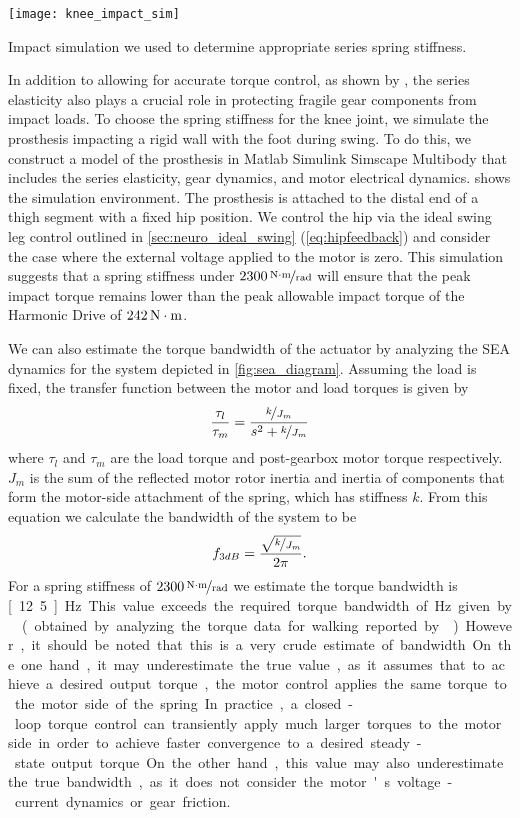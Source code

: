 \begin{marginfigure}[2.5in]
    \centering 
    \texttt{[image: knee\_impact\_sim]}
    \caption{Impact simulation we used to determine appropriate series spring
    stiffness.}\label{fig:knee_impact_sim}
\end{marginfigure}
In addition to allowing for accurate torque control, as shown by
\citet{au2007biomechanical,au2008powered}, the series elasticity also plays a
crucial role in protecting fragile gear components from impact loads. To choose
the spring stiffness for the knee joint, we simulate the prosthesis impacting a
rigid wall with the foot during swing. To do this, we construct a model of the
prosthesis in Matlab Simulink Simscape Multibody that includes the
series elasticity, gear dynamics, and motor electrical dynamics.
 shows the simulation environment. The prosthesis is
attached to the distal end of a thigh segment with a fixed hip position. We
control the hip via the ideal swing leg control outlined in
\cref{sec:neuro_ideal_swing} (\cref{eq:hipfeedback}) and consider the case where
the external voltage applied to the motor is zero. This simulation suggests that
a spring stiffness under $\unitfrac[2300]{N \cdot m}{rad}$ will ensure that the
peak impact torque remains lower than the peak allowable impact torque of the
Harmonic Drive of $\unit[242]{N \cdot m}$.

We can also estimate the torque bandwidth of the actuator by analyzing the SEA
dynamics for the system depicted in \cref{fig:sea_diagram}. Assuming the load
is fixed, the transfer function between the motor and load torques is given by
\begin{align}
    \frac{\tau_l}{\tau_m} = \frac{\nicefrac{k}{J_m}}{s^2 + \nicefrac{k}{J_m}}
\end{align}
where $\tau_l$ and $\tau_m$ are the load torque and post-gearbox motor torque
respectively. $J_m$ is the sum of the reflected motor rotor inertia and inertia
of components that form the motor-side attachment of the spring, which has
stiffness $k$. From this equation we calculate the bandwidth of the system
to be
\begin{align}
    f_{3 dB} = \frac{\sqrt{\nicefrac{k}{J_m}}}{2 \pi}.
\end{align}
For a spring stiffness of $\unitfrac[2300]{N \cdot m}{rad}$ we estimate the
torque bandwidth is \unit[12.5]{Hz}. This value exceeds the required torque
bandwidth of \unit[4]{Hz} given by \citet{sergi2012design} (obtained by
analyzing the torque data for walking reported by
\citet{winter2009biomechanics}). However, it should be noted that this is a very
crude estimate of bandwidth. On the one hand, it may underestimate the true
value, as it assumes that to achieve a desired output torque, the motor control
applies the same torque to the motor side of the spring. In practice, a
closed-loop torque control can transiently apply much larger torques to the
motor side in order to achieve faster convergence to a desired steady-state
output torque. On the other hand, this value may also underestimate the true
bandwidth, as it does not consider the motor's voltage-current dynamics or gear
friction.

